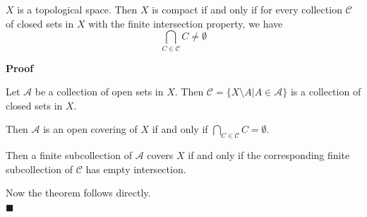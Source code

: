 \documentclass[main.tex]{subfiles}
\begin{document}
\begin{theorem}
    $X$ is a topological space. Then $X$ is compact if and only if for every collection $\mathcal{C}$ of closed sets in $X$ with the finite intersection property, we have
    \begin{equation}
        \bigcap_{C \in \mathcal{C}} C \neq \emptyset
    \end{equation}
\end{theorem}

\par \noindent \textbf{Proof} 
\par Let $\mathcal{A}$ be a collection of open sets in $X$. Then $\mathcal{C} = \{X \setminus A | A \in \mathcal{A}\}$ is a collection of closed sets in $X$. 
\par Then $\mathcal{A}$ is an open covering of $X$ if and only if $\bigcap_{C \in \mathcal{C}} C = \emptyset$. 
\par Then a finite subcollection of $\mathcal{A}$ covers $X$ if and only if the corresponding finite subcollection of $\mathcal{C}$ has empty intersection. 
\par Now the theorem follows directly.
\mbox{} \\ \null \hfill $\blacksquare$ 
\end{document}
